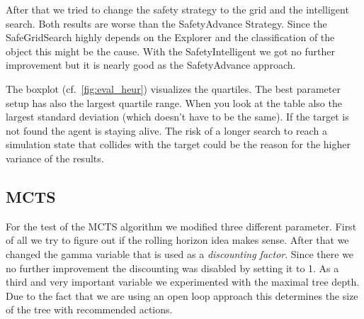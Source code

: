 After that we tried to change the safety strategy to the grid and the intelligent search. Both results
are worse than the SafetyAdvance Strategy. Since the SafeGridSearch highly depends on the Explorer and the
classification of the object this might be the cause.
With the SafetyIntelligent we got no further improvement but it is nearly good as the SafetyAdvance approach.

The boxplot (cf.~\cref{fig:eval_heur}) visualizes the quartiles. The best parameter setup has also the largest
quartile range. When you look at the table also the largest standard deviation (which doesn't have to be the same).
If the target is not found the agent is staying alive. The risk of a longer search to reach a simulation state
that collides with the target could be the reason for the higher variance of the results.



\subsection{MCTS} 

For the test of the \ac{MCTS} algorithm we modified three different parameter. First of all we try to figure out
if the rolling horizon idea makes sense. After that we changed the gamma variable that is used
as a \textit{discounting factor}. Since there we no further improvement the discounting was disabled by setting it to 1.
As a third and very important variable we experimented with the maximal tree depth. Due to the fact that we are using an open loop approach this determines 
the size of the tree with recommended actions.


